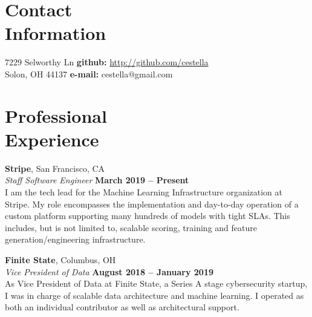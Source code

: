 \documentclass[margin,line,12pt]{resume}
\begin{document}
\begin{resume}
    \thispagestyle{empty}
    \section{\mysidestyle Contact\\Information}

    7229 Selworthy Ln \hfill {\bf github:} \url{http://github.com/cestella} \vspace{0mm}\\\vspace{0mm}%
    Solon, OH 44137 \hfill {\bf e-mail:} cestella@gmail.com       \vspace{0mm}\\\vspace{-4.5mm}%


    \section{\mysidestyle Professional\\Experience}
    \textbf{Stripe}, San Francisco, CA\vspace{2mm}\\\vspace{1mm}%
    \textsl{Staff Software Engineer} \hfill \textbf{March 2019 -- Present}\\
    I am the tech lead for the Machine Learning Infrastructure organization at Stripe. My
    role encompasses the implementation and day-to-day operation of a custom platform
    supporting many hundreds of models with tight SLAs. This includes, but is not
    limited to, scalable scoring, training and feature generation/engineering infrastructure.

    \textbf{Finite State}, Columbus, OH\vspace{2mm}\\\vspace{1mm}%
    \textsl{Vice President of Data} \hfill \textbf{August 2018 -- January 2019}\\
    As Vice President of Data at Finite State, a Series A stage cybersecurity startup, I
    was in charge of scalable data architecture and machine learning.  I operated as both
    an individual contributor as well as architectural support.


\end{resume}
\end{document}
